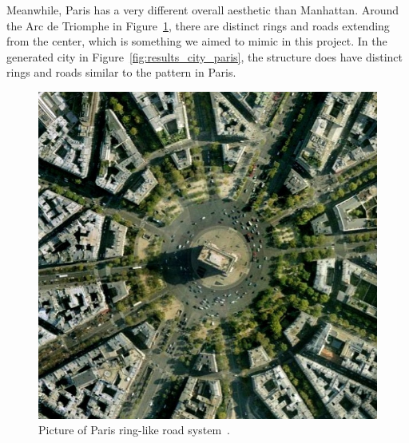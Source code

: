 Meanwhile, Paris has a very different overall aesthetic than Manhattan.
Around the Arc de Triomphe in Figure~\ref{fig:results_real_city_paris}, there are distinct rings and roads extending from the center, which is something we aimed to mimic in this project.
In the generated city in Figure~\ref{fig:results_city_paris}, the structure does have distinct rings and roads similar to the pattern in Paris. 

\begin{figure}[H]
  \centering
  \begin{minipage}[b]{.41\textwidth}
    \centering
    \begin{minipage}[b]{.9\textwidth}
      \centering
      \includegraphics[width=\textwidth]{figure/results/paris_arc_de_triomphe.jpg}
      \caption{Picture of Paris ring-like road system~\cite{paris_city_img}.}
      \label{fig:results_real_city_paris}
    \end{minipage}
  \end{minipage}
  \begin{minipage}[b]{.49\textwidth}
    \begin{minipage}[b]{.9\textwidth}
      \centering
      \centering

\end{minipage}
\end{minipage}
\end{figure}
